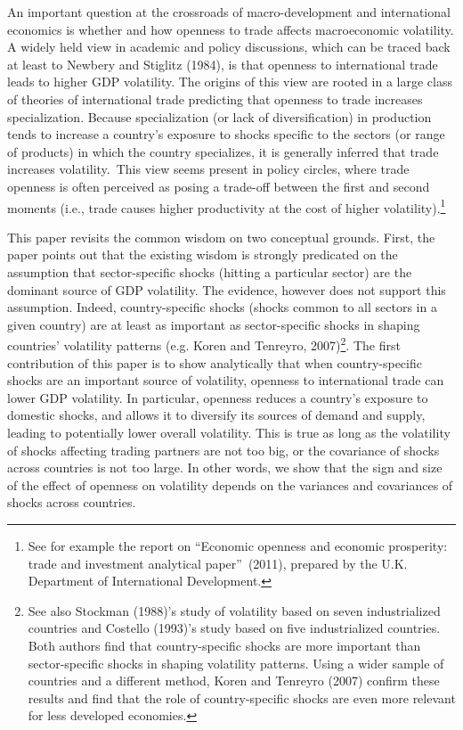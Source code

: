\documentclass[12pt]{article}
\begin{document}
An important question at the crossroads of macro-development and
international economics is whether and how openness to trade affects
macroeconomic volatility. A widely held view in academic and policy
discussions, which can be traced back at least to Newbery and Stiglitz
(1984), is that openness to international trade leads to higher GDP
volatility. The origins of this view are rooted in a large class of theories
of international trade predicting that openness to trade increases
specialization. Because specialization (or lack of diversification) in
production tends to increase a country's exposure to shocks specific to the
sectors (or range of products) in which the country specializes, it is
generally inferred that trade increases volatility.\ This view seems present
in policy circles, where trade openness is often perceived as posing a
trade-off between the first and second moments (i.e., trade causes higher
productivity at the cost of higher volatility).\footnote{%
See for example the report on \textquotedblleft Economic openness and
economic prosperity: trade and investment analytical
paper\textquotedblright\ (2011), prepared by the U.K. Department of
International Development.}

This paper revisits the common wisdom on two conceptual grounds. First, the
paper points out that the existing wisdom is strongly predicated on the
assumption that sector-specific shocks (hitting a particular sector) are the
dominant source of GDP volatility. The evidence, however does not support
this assumption. Indeed, country-specific shocks (shocks common to all
sectors in a given country) are at least as important as sector-specific
shocks in shaping countries' volatility patterns (e.g. Koren and Tenreyro,
2007)\footnote{%
See also Stockman (1988)'s study of volatility based on seven industrialized
countries and Costello (1993)'s study based on five industrialized
countries. Both authors find that country-specific shocks are more important
than sector-specific shocks in shaping volatility patterns. Using a wider
sample of countries and a different method, Koren and Tenreyro (2007)
confirm these results and find that the role of country-specific shocks are
even more relevant for less developed economies.}. The first contribution of
this paper is to show analytically that when country-specific shocks are an
important source of volatility, openness to international trade can lower
GDP volatility. In particular, openness reduces a country's exposure to
domestic shocks, and allows it to diversify its sources of demand and
supply, leading to potentially lower overall volatility. This is true as
long as the volatility of shocks affecting trading partners are not too big,
or the covariance of shocks across countries is not too large. In other
words, we show that the sign and size of the effect of openness on
volatility depends on the variances and covariances of shocks across
countries.
\end{document}
